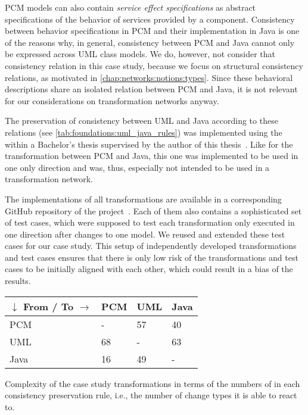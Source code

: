 \gls{PCM} models can also contain \emph{service effect specifications} as abstract specifications of the behavior of services provided by a component.
Consistency between behavior specifications in \gls{PCM} and their implementation in Java is one of the reasons why, in general, consistency between \gls{PCM} and Java cannot only be expressed across \gls{UML} class models.
We do, however, not consider that consistency relation in this case study, because we focus on structural consistency relations, as motivated in \autoref{chap:networks:notions:types}.
Since these behavioral descriptions share an isolated relation between \gls{PCM} and Java, it is not relevant for our considerations on transformation networks anyway.

The preservation of consistency between \gls{UML} and Java according to these relations (see \autoref{tab:foundations:uml_java_rules}) was implemented using the \reactionslanguage within a Bachelor's thesis supervised by the author of this thesis~.
Like for the transformation between \gls{PCM} and Java, this one was implemented to be used in one only direction and was, thus, especially not intended to be used in a transformation network.

The implementations of all transformations are available in a corresponding GitHub repository of the \vitruv project~.
Each of them also contains a sophisticated set of test cases, which were supposed to test each transformation only executed in one direction after changes to one model.
We reused and extended these test cases for our case study.
This setup of independently developed transformations and test cases ensures that there is only low risk of the transformations and test cases to be initially aligned with each other, which could result in a bias of the results.

\begin{propertable}
    \begin{tabular}{L{7em}C{4em}C{4em}C{4em}}
        \toprule
        \textbf{$\downarrow$ From} / \textbf{To $\rightarrow$}& \gls{PCM} & \gls{UML} & Java \\
        \midrule
        \gls{PCM} & -   & 57    & 40 \\
        \gls{UML} & 68  & -     & 63 \\
        Java      & 16  & 49    & -  \\
        \bottomrule
    \end{tabular}
    \caption[Complexity of case study transformations]{Complexity of the case study transformations in terms of the numbers of \reactions in each consistency preservation rule, i.e., the number of change types it is able to react to.}
    \label{tab:correctness_evaluation:errors:study_complexity}
\end{propertable}

